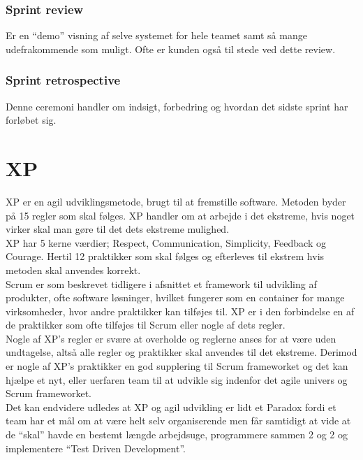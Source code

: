 \subsubsection{Sprint review}
Er en “demo” visning af selve systemet for hele teamet samt så mange udefrakommende som muligt. Ofte er kunden 
også til stede ved dette review.

\subsubsection{Sprint retrospective}
Denne ceremoni handler om indsigt, forbedring og hvordan det sidste sprint har forløbet sig.

\section{XP}\label{sec:xp}
XP er en agil udviklingsmetode, brugt til at fremstille software. Metoden byder på 15 regler som skal følges. 
XP handler om at arbejde i det ekstreme, hvis noget virker skal man gøre til det dets ekstreme mulighed.  \\

XP har 5 kerne værdier; Respect, Communication, Simplicity, Feedback og Courage. Hertil 12 praktikker som 
skal følges og efterleves til ekstrem hvis metoden skal anvendes korrekt. \\

Scrum er som beskrevet tidligere i afsnittet et framework til udvikling af produkter, ofte software løsninger, 
hvilket fungerer som en container for mange virksomheder, hvor andre praktikker kan tilføjes til. XP er i den 
forbindelse en af de praktikker som ofte tilføjes til Scrum eller nogle af dets regler. \\

Nogle af XP’s regler er svære at overholde og reglerne anses for at være uden undtagelse, altså alle regler 
og praktikker skal anvendes til det ekstreme. Derimod er nogle af XP’s praktikker en god supplering til 
Scrum frameworket og det kan hjælpe et nyt, eller uerfaren team til at udvikle sig indenfor det agile 
univers og Scrum frameworket. \\

Det kan endvidere udledes at XP og agil udvikling er lidt et Paradox fordi et team har et mål om at være 
helt selv organiserende men får samtidigt at vide at de “skal” havde en bestemt længde arbejdsuge, programmere 
sammen 2 og 2 og implementere “Test Driven Development”. 

